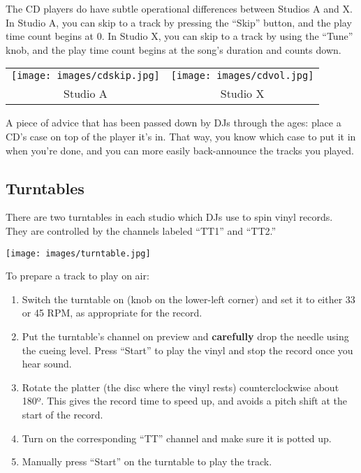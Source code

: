\documentclass{witrman}
\begin{document}
The CD players do have subtle operational differences between Studios A and X.
In Studio A, you can skip to a track by pressing the ``Skip'' button, and the
play time count begins at 0.  In Studio X, you can skip to a track by using the
``Tune'' knob, and the play time count begins at the song's duration and counts
down.

\begin{tabular}{cc}
    \texttt{[image: images/cdskip.jpg]} &
    \texttt{[image: images/cdvol.jpg]} \\

    Studio A &
    Studio X \\
\end{tabular}


A piece of advice that has been passed down by DJs through the ages: place a
CD's case on top of the player it's in.  That way, you know which case to put it
in when you're done, and you can more easily back-announce the tracks you played.

\subsection{Turntables}

There are two turntables in each studio which DJs use to spin vinyl records.
They are controlled by the channels labeled ``TT1'' and ``TT2.''

\texttt{[image: images/turntable.jpg]}
\pagebreak

To prepare a track to play on air:
\begin{enumerate}
    \item Switch the turntable on (knob on the lower-left corner) and set it to
        either 33 or 45 RPM, as appropriate for the record.
    \item Put the turntable's channel on preview and \textbf{carefully} drop the
        needle using the cueing level.  Press ``Start'' to play the vinyl and
        stop the record once you hear sound.
    \item Rotate the platter (the disc where the vinyl rests) counterclockwise
        about 180º.  This gives the record time to speed up, and avoids a pitch
        shift at the start of the record.
    \item Turn on the corresponding ``TT'' channel and make sure it is potted
        up.
    \item Manually press ``Start'' on the turntable to play the track.
\end{enumerate}
\end{document}

